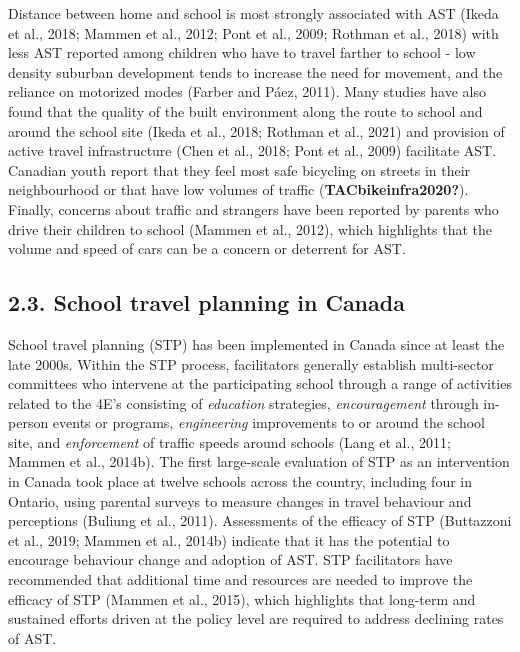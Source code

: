 \documentclass[]{elsarticle} %
\begin{document}
Distance between home and school is most strongly associated with AST
(Ikeda et al., 2018; Mammen et al., 2012; Pont et al., 2009; Rothman et
al., 2018) with less AST reported among children who have to travel
farther to school - low density suburban development tends to increase
the need for movement, and the reliance on motorized modes (Farber and
Páez, 2011). Many studies have also found that the quality of the built
environment along the route to school and around the school site (Ikeda
et al., 2018; Rothman et al., 2021) and provision of active travel
infrastructure (Chen et al., 2018; Pont et al., 2009) facilitate AST.
Canadian youth report that they feel most safe bicycling on streets in
their neighbourhood or that have low volumes of traffic
(\textbf{TACbikeinfra2020?}). Finally, concerns about traffic and
strangers have been reported by parents who drive their children to
school (Mammen et al., 2012), which highlights that the volume and speed
of cars can be a concern or deterrent for AST.

\hypertarget{school-travel-planning-in-canada}{%
\subsection{2.3. School travel planning in
Canada}\label{school-travel-planning-in-canada}}

School travel planning (STP) has been implemented in Canada since at
least the late 2000s. Within the STP process, facilitators generally
establish multi-sector committees who intervene at the participating
school through a range of activities related to the 4E's consisting of
\emph{education} strategies, \emph{encouragement} through in-person
events or programs, \emph{engineering} improvements to or around the
school site, and \emph{enforcement} of traffic speeds around schools
(Lang et al., 2011; Mammen et al., 2014b). The first large-scale
evaluation of STP as an intervention in Canada took place at twelve
schools across the country, including four in Ontario, using parental
surveys to measure changes in travel behaviour and perceptions (Buliung
et al., 2011). Assessments of the efficacy of STP (Buttazzoni et al.,
2019; Mammen et al., 2014b) indicate that it has the potential to
encourage behaviour change and adoption of AST. STP facilitators have
recommended that additional time and resources are needed to improve the
efficacy of STP (Mammen et al., 2015), which highlights that long-term
and sustained efforts driven at the policy level are required to address
declining rates of AST.
\end{document}
